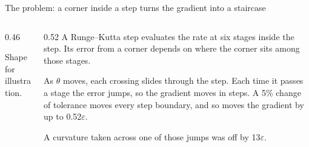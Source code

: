 \documentclass[aspectratio=169,10pt]{beamer}
\newcommand{\illus}{\par{\tiny\color{quiet} Shape for illustration.}}
\begin{document}
\begin{frame}{The problem: a corner inside a step turns the gradient into a staircase}
  \begin{columns}[T]
    \begin{column}{0.46\textwidth}
      \illus
    \end{column}
    \begin{column}{0.52\textwidth}
      \small
      A Runge--Kutta step evaluates the rate at six stages inside the step. Its error from a
      corner depends on where the corner sits among those stages.
      \medskip

      As $\theta$ moves, each crossing slides through the step. Each time it passes a stage
      the error jumps, so the gradient moves in steps. A 5\% change of tolerance moves every
      step boundary, and so moves the gradient by up to 0.52$\varepsilon$.
      \medskip

      A curvature taken across one of those jumps was off by 13$\varepsilon$.
    \end{column}
  \end{columns}
\end{frame}
\end{document}
